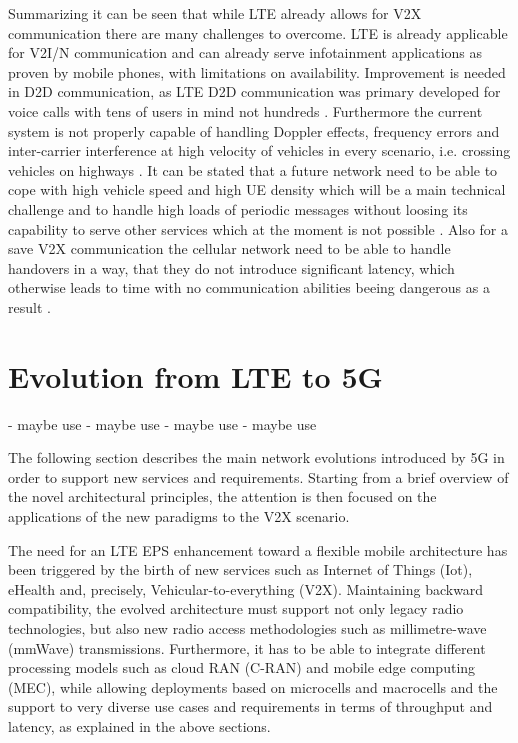 \documentclass[conference,12pt,onecolumn]{IEEEtran}
\begin{document}
Summarizing it can be seen that while LTE already allows for V2X communication there are many challenges to overcome. LTE is already applicable for V2I/N communication \cite{seo2016} and can already serve infotainment applications as proven by mobile phones, with limitations on availability. Improvement is needed in D2D communication, as LTE D2D communication was primary developed for voice calls with tens of users in mind not hundreds \cite{seo2016}. Furthermore the current system is not properly capable of handling Doppler effects, frequency errors and inter-carrier interference at high velocity of vehicles in every scenario, i.e. crossing vehicles on highways \cite{seo2016}. It can be stated that a future network need to be able to cope with high vehicle speed and high UE density which will be a main technical challenge \cite{seo2016} and to handle high loads of periodic messages without loosing its capability to serve other services \cite{lee2016} which at the moment is not possible \cite{lee2016}. Also for a save V2X communication the cellular network need to be able to handle handovers in a way, that they do not introduce significant latency, which otherwise leads to time with no communication abilities beeing dangerous as a result \cite{seo2016}.

\section{Evolution from LTE to 5G}
- maybe use \cite{lee2016}
- maybe use  \cite{boban2017}
- maybe use \cite{boban2016}
- maybe use \cite{di2017}

The following section describes the main network evolutions introduced by 5G in order to support new services and requirements. Starting from a brief overview of the novel architectural principles, the attention is then focused on the applications of the new paradigms to the V2X scenario.

The need for an LTE EPS enhancement toward a flexible mobile architecture has been triggered by the birth of new services such as Internet of Things (Iot), eHealth and, precisely, Vehicular-to-everything (V2X). Maintaining backward compatibility, the evolved architecture must support not only legacy radio technologies, but also new radio access methodologies such as millimetre-wave (mmWave) transmissions. Furthermore, it has to be able to integrate different processing models such as cloud RAN (C-RAN) and mobile edge computing (MEC), while allowing deployments  based on microcells and macrocells and the support to very diverse use cases and requirements in terms of throughput and latency, as explained in the above sections.
\end{document}
